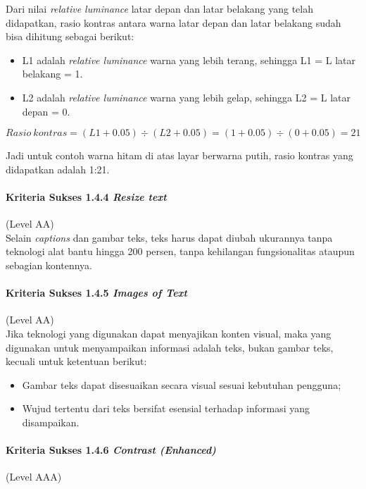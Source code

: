 Dari nilai \textit{relative luminance} latar depan dan latar belakang yang telah didapatkan, rasio kontras antara warna latar depan dan latar belakang sudah bisa dihitung sebagai berikut:
\begin{itemize}
	\item L1 adalah \textit{relative luminance} warna yang lebih terang, sehingga L1 = L latar belakang = 1.
	\item L2 adalah \textit{relative luminance} warna yang lebih gelap, sehingga L2 = L latar depan = 0.
\end{itemize}
\[
	Rasio\ kontras = (L1 + 0.05) \div (L2 + 0.05) = (1 + 0.05) \div (0 + 0.05) = 21
\]

Jadi untuk contoh warna hitam di atas layar berwarna putih, rasio kontras yang didapatkan adalah 1:21. 

\paragraph{Kriteria Sukses 1.4.4 \textit{Resize text}}
\label{sec:kriteria_sukses_1.4.4}
(Level AA)\\

Selain \textit{captions} dan gambar teks, teks harus dapat diubah ukurannya tanpa teknologi alat bantu hingga 200 persen, tanpa kehilangan fungsionalitas ataupun sebagian kontennya.

\paragraph{Kriteria Sukses 1.4.5 \textit{Images of Text}}
\label{sec:kriteria_sukses_1.4.5}
(Level AA)\\

Jika teknologi yang digunakan dapat menyajikan konten visual, maka yang digunakan untuk menyampaikan informasi adalah teks, bukan gambar teks, kecuali untuk ketentuan berikut:

\begin{itemize}
	\item Gambar teks dapat disesuaikan secara visual sesuai kebutuhan pengguna;
	\item Wujud tertentu dari teks bersifat esensial terhadap informasi yang disampaikan.
\end{itemize}

\paragraph{Kriteria Sukses 1.4.6 \textit{Contrast (Enhanced)}}
\label{sec:kriteria_sukses_1.4.6}
(Level AAA)\\

